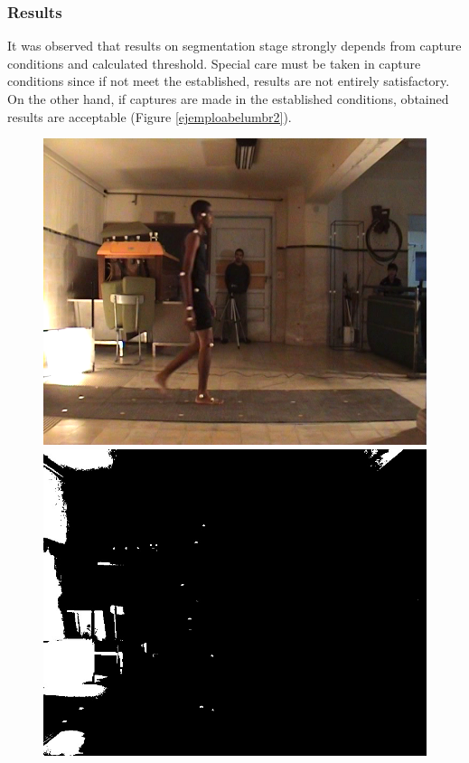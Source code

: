 \subsubsection{Results}
It was observed that results on segmentation stage strongly depends from capture conditions and calculated threshold. Special care must be taken in capture conditions since if not meet the established, results are not entirely satisfactory.
On the other hand, if captures are made in the established conditions, obtained results are acceptable (Figure \ref{ejemploabelumbr2}).
\vspace{-0.5cm}
\begin{figure}[ht!]
      \centering
        {\includegraphics[scale=0.10]{imagenes/abel_original_video.png}\label{abelvideo}}\hspace{1 mm}
        {\includegraphics[scale=0.10]{imagenes/abel_original_filtro.png}\label{abelfiltro}}

\end{figure}
